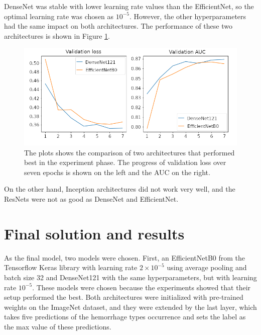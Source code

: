 \documentclass[thesis=B,english]{FITthesis}[2019/12/23]
\begin{document}
DenseNet was stable with lower learning rate values than the EfficientNet, so the optimal learning rate was chosen as $10^{-5}$. However, the other hyperparameters had the same impact on both architectures. The performance of these two architectures is shown in Figure \ref{fig:DensexEff}.

\begin{figure}[ht]
		\includegraphics[scale=0.48]{images/DenseNet_x_EfficientNet.png}
		\centering
		\caption{The plots shows the comparison of two architectures that performed best in the experiment phase. The progress of validation loss over seven epochs is shown on the left and the AUC on the right.}
		\label{fig:DensexEff}
\end{figure}

On the other hand, Inception architectures did not work very well, and the ResNets were not as good as DenseNet and EfficientNet.

%

\section{Final solution and results}
As the final model, two models were chosen. First, an EfficientNetB0 from the Tensorflow Keras library with learning rate $2\times10^{-5}$ using average pooling and batch size 32 and DenseNet121 with the same hyperparameters, but with learning rate $10^{-5}$. These models were chosen because the experiments showed that their setup performed the best. Both architectures were initialized with pre-trained weights on the ImageNet dataset, and they were extended by the last layer, which takes five predictions of the hemorrhage types occurrence and sets the  label as the max value of these predictions.
\end{document}
